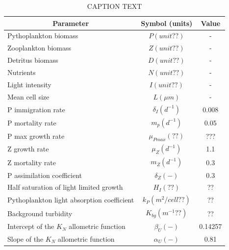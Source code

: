 \begin{table}[H]
\centering
\caption{CAPTION TEXT}
\label{tab:param}
\begin{tabular}{lcc}
\hline
\multicolumn{1}{c}{Parameter}               & Symbol (units)                    & Value     \\ \hline
Pythoplankton biomass                       & $P (unit??)$                      & -         \\
Zooplankton biomass                         & $Z (unit??)$                      & -         \\
Detritus biomass                            & $D (unit??)$                      & -         \\
Nutrients                                   & $N (unit??)$                      & -         \\
Light intensity                             & $I (unit??)$                      & -         \\
Mean cell size                              & $L (\mu m)$                       & -         \\
P immigration rate                          & $\delta_I (d^{-1})$               & 0.008     \\
P mortality rate                            & $m_p (d^{-1})$                    & 0.05      \\
P max growth rate                           & $\mu_{Pmax} (??)$                 & ???       \\
Z growth rate                               & $\mu_Z (d^{-1})$                  & 1.1       \\
Z mortality rate                            & $m_Z (d^{-1})$                    & 0.3       \\
P assimilation coefficient                  & $\delta_Z (-)$                    & 0.3       \\
Half saturation of light limited growth     & $H_I (??)$                        & ??        \\
Pythoplankton light absorption coefficient  & $k_P (m^2/cell??)$                & ??        \\
Background turbidity                        & $K_{bg} (m^{-1} ??)$              & ??        \\
Intercept of the $K_N$ allometric function  & $\beta_U (-)$                     & 0.14257   \\
Slope of the $K_N$ allometric function      & $\alpha_U (-)$                    & 0.81      \\

\end{tabular}
\end{table}
